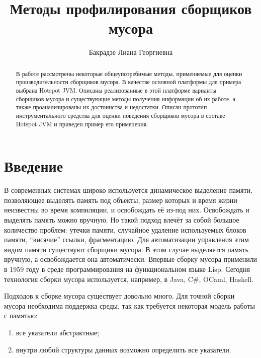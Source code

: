 \title{Методы профилирования сборщиков мусора}
%
\author{Бакрадзе Лиана Георгиевна}
%
%
%

\maketitle              %

\begin{abstract}
В работе рассмотрены некоторые общеупотребимые методы, применяемые для
оценки производительности сборщиков мусора. В качестве основной платформы
для примера выбрана Hotspot JVM. Описаны реализованные в этой платформе
варианты сборщиков мусора и существующие методы получения информации об
их работе, а также проанализированы их достоинства и недостатки. Описан
прототип инструментального средства для оценки поведения сборщиков мусора 
в составе Hotspot JVM и приведен пример его применения.
\end{abstract}
%


\section*{Введение}
В современных системах широко используется динамическое выделение памяти, позволяющее 
выделять память под объекты, размер которых и время жизни неизвестны во время компиляции, 
и освобождать её из-под них. Освобождать и выделять память можно вручную. Но такой
подход влечёт за собой большое количество проблем: утечки памяти, случайное удаление 
используемых блоков памяти, ``висячие'' ссылки, фрагментацию. Для автоматизации управления этим видом 
памяти существуют сборщики мусора. В этом случае выделяется память вручную, а освобождается 
она автоматически. Впервые сборку мусора применили в 1959 году в среде программирования 
на функциональном языке Lisp. Сегодня технология сборки мусора используется, например,
в Java, C\#, OCaml, Haskell.

Подходов к сборке мусора существует довольно много. Для точной сборки мусора необходима 
поддержка среды, так как требуется некоторая модель работы с памятью:

\begin{enumerate}
\item все указатели абстрактные;
\item внутри любой структуры данных возможно определить все указатели.
\end{enumerate}

